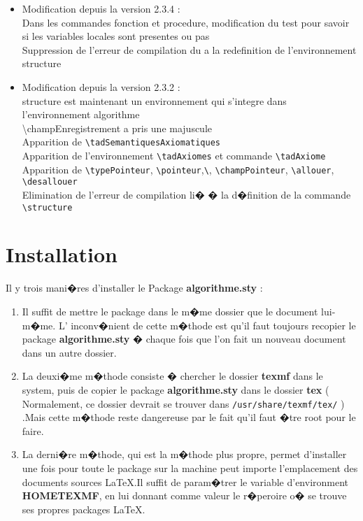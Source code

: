 \documentclass[a4paper,12pt]{report}
\begin{document}
\begin{itemize}
  \item Modification depuis la version 2.3.4 :\\
   \textbullet   Dans les commandes fonction et procedure, modification du test pour savoir si les variables locales sont presentes ou pas\\
   \textbullet   Suppression de l'erreur de compilation du a la redefinition de l'environnement structure\\

  \item  Modification depuis la version 2.3.2 :\\
   \textbullet structure est maintenant un environnement qui s'integre dans l'environnement algorithme\\
   \textbullet \textbackslash champEnregistrement a pris une majuscule\\
   \textbullet Apparition de \texttt{\textbackslash tadSemantiquesAxiomatiques}\\
   \textbullet   Apparition de l'environnement \texttt{\textbackslash tadAxiomes} et commande \texttt{\textbackslash tadAxiome}\\
   \textbullet   Apparition de \texttt{\textbackslash typePointeur}, \texttt{\textbackslash pointeur},\texttt{\textbackslash \pointeurNULL}, \texttt{\textbackslash champPointeur}, \texttt{\textbackslash allouer}, \texttt{\textbackslash desallouer}\\
   \textbullet   Elimination de l'erreur de compilation li� � la d�finition de la commande \texttt{\textbackslash structure}
\end{itemize}

\section{Installation}

Il y trois mani�res d'installer le Package \textbf{algorithme.sty} : 
\begin{enumerate}
  \item Il suffit de mettre le package dans le m�me dossier que le document lui-m�me.
L' inconv�nient de cette m�thode est qu'il faut toujours recopier le package \textbf{algorithme.sty} � chaque fois que l'on fait un nouveau document dans un autre dossier.

 \item La deuxi�me m�thode consiste � chercher le dossier \textbf{texmf} dans le system, puis de copier le package \textbf{algorithme.sty} dans le dossier \textbf{tex} ( Normalement, ce dossier devrait se trouver dans \texttt{/usr/share/texmf/tex/} ) .Mais cette m�thode reste dangereuse par le fait qu'il faut �tre root pour le faire. 

 \item La derni�re m�thode, qui est la m�thode plus propre,  permet d'installer une fois pour toute le package sur la machine peut importe l'emplacement des documents sources \LaTeX.Il suffit de param�trer le variable d'environment \textbf{HOMETEXMF}, en lui donnant comme valeur le r�peroire o� se trouve ses propres packages \LaTeX .

\end{enumerate}
\end{document}

